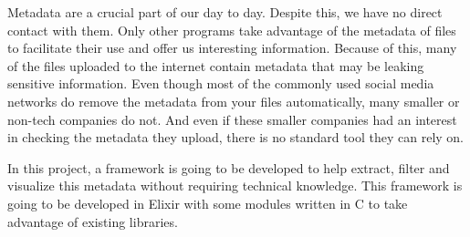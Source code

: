 Metadata are a crucial part of our day to day. Despite this, we have no direct contact with them. Only other programs take advantage of the metadata of files to facilitate their use and offer us interesting information. Because of this, many of the files uploaded to the internet contain metadata that may be leaking sensitive information. Even though most of the commonly used social media networks do remove the metadata from your files automatically, many smaller or non-tech companies do not. And even if these smaller companies had an interest in checking the metadata they upload, there is no standard tool they can rely on.

In this project, a framework is going to be developed to help extract, filter and visualize this metadata without requiring technical knowledge. This framework is going to be developed in Elixir with some modules written in C to take advantage of existing libraries. 

